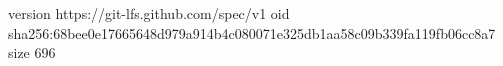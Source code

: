 version https://git-lfs.github.com/spec/v1
oid sha256:68bee0e17665648d979a914b4c080071e325db1aa58c09b339fa119fb06cc8a7
size 696
